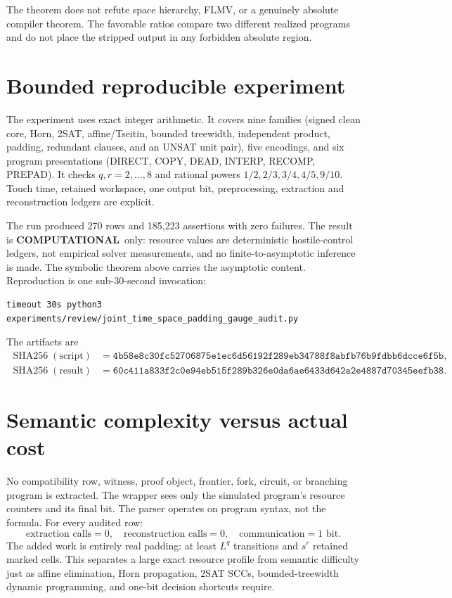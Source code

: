 \documentclass[11pt]{article}
\newcommand{\COMP}{\textbf{COMPUTATIONAL}}
\begin{document}
The theorem does not refute space hierarchy, FLMV, or a genuinely absolute
compiler theorem.  The favorable ratios compare two different realized
programs and do not place the stripped output in any forbidden absolute region.

\section{Bounded reproducible experiment}

The experiment
uses exact integer arithmetic.  It covers nine families (signed clean core,
Horn, 2SAT, affine/Tseitin, bounded treewidth, independent product, padding,
redundant clauses, and an UNSAT unit pair), five encodings, and six program
presentations (DIRECT, COPY, DEAD, INTERP, RECOMP, PREPAD).  It checks
$q,r=2,\ldots,8$ and rational powers
$1/2,2/3,3/4,4/5,9/10$.  Touch time, retained workspace, one output bit,
preprocessing, extraction and reconstruction ledgers are explicit.

The run produced 270 rows and 185,223 assertions with zero failures.  The
result is \COMP\ only: resource values are deterministic hostile-control
ledgers, not empirical solver measurements, and no finite-to-asymptotic
inference is made.  The symbolic theorem above carries the asymptotic content.
Reproduction is one sub-30-second invocation:
\begin{verbatim}
timeout 30s python3 experiments/review/joint_time_space_padding_gauge_audit.py
\end{verbatim}
The artifacts are
\begin{align*}
\operatorname{SHA256}(\text{script})&=
\texttt{4b58e8c30fc52706875e1ec6d56192f289eb34788f8abfb76b9fdbb6dcce6f5b},\\
\operatorname{SHA256}(\text{result})&=
\texttt{60c411a833f2c0e94eb515f289b326e0da6ae6433d642a2e4887d70345eefb38}.
\end{align*}

\section{Semantic complexity versus actual cost}

No compatibility row, witness, proof object, frontier, fork, circuit, or
branching program is extracted.  The wrapper sees only the simulated program's
resource counters and its final bit.  The parser operates on program syntax,
not the formula.  For every audited row:
\[
 \text{extraction calls}=0,\quad
 \text{reconstruction calls}=0,\quad
 \text{communication}=1\text{ bit}.
\]
The added work is entirely real padding: at least $L^q$ transitions and $s^r$
retained marked cells.  This separates a large exact resource profile from
semantic difficulty just as affine elimination, Horn propagation, 2SAT SCCs,
bounded-treewidth dynamic programming, and one-bit decision shortcuts require.
\end{document}
